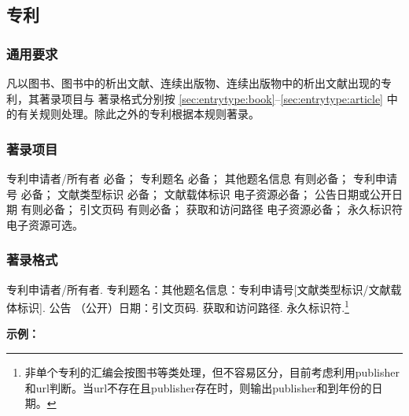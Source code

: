 \documentclass[twoside]{article}%
\begin{document}
\subsection{专利}\label{sec:entrytype:patent}

\subsubsection{通用要求}

凡以图书、图书中的析出文献、连续出版物、连续出版物中的析出文献出现的专利，其著录项目与
著录格式分别按 \ref{sec:entrytype:book}--\ref{sec:entrytype:article} 中的有关规则处理。除此之外的专利根据本规则著录。

\subsubsection{著录项目}

专利申请者/所有者 必备；
专利题名 必备；
其他题名信息 有则必备；
专利申请号 必备；
文献类型标识 必备；
文献载体标识 电子资源必备；
公告日期或公开日期 有则必备；
引文页码 有则必备；
获取和访问路径 电子资源必备；
永久标识符 电子资源可选。

\subsubsection{著录格式}

专利申请者/所有者. 专利题名：其他题名信息：专利申请号[文献类型标识/文献载体标识]. 公告
（公开）日期：引文页码. 获取和访问路径. 永久标识符.\footnote{非单个专利的汇编会按图书等类处理，但不容易区分，目前考虑利用publisher和url判断。当url不存在且publisher存在时，则输出publisher和到年份的日期。}



\begin{refsection}

\nocite{邓一刚2006--,张凯军2012-04-05--,李华2023,
西安电子科技大学2002--,河北绿洲生态环境科技有限公司2001--,
苏州生物2022,Tachibana2005--,TRISCO2022,中国焊接协会2023}



{

\textbf{示例：}

{\printbibliography[heading=none,env=indentegenv]}
}
\end{refsection}
\end{document}
